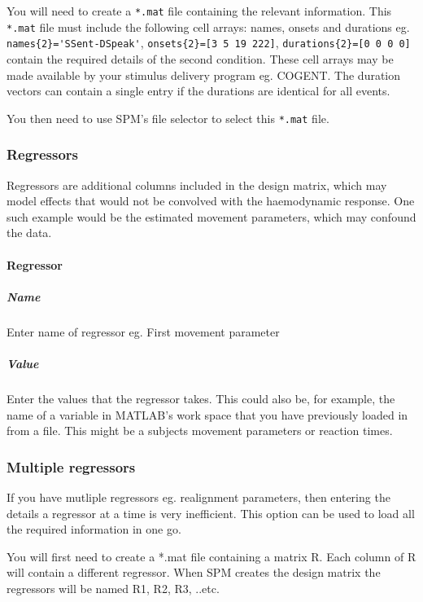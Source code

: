 You will need to create a \verb!*.mat! file containing the relevant information. This \verb!*.mat! file must include the following cell arrays: names, onsets and durations eg. \verb!names{2}='SSent-DSpeak'!, \verb!onsets{2}=[3 5 19 222]!, \verb!durations{2}=[0 0 0 0]! contain the required details of the second condition. These cell arrays may be made available by your stimulus delivery program eg. COGENT. The duration vectors can contain a single entry if the durations are identical for all events. 

You then need to use SPM's file selector to select this \verb!*.mat! file.

\subsubsection{Regressors}

Regressors are additional columns included in the design matrix, which may model effects that would not be convolved with the haemodynamic response.  One such example would be the estimated movement parameters, which may confound the data.

\paragraph{Regressor}

\subparagraph{Name}

Enter name of regressor eg. First movement parameter

\subparagraph{Value}

Enter the values that the regressor takes. This could also be, for example, the name of a variable in MATLAB's work space that you have previously loaded in from a file. This might be a subjects movement parameters or reaction times.

\subsubsection{Multiple regressors}

If you have mutliple regressors eg. realignment parameters, then entering the details a regressor at a time is very inefficient. This option can be used to load all the required information in one go. 

You will first need to create a *.mat file containing a matrix R. Each column of R will contain a different regressor. When SPM creates the design matrix the regressors will be named R1, R2, R3, ..etc.

